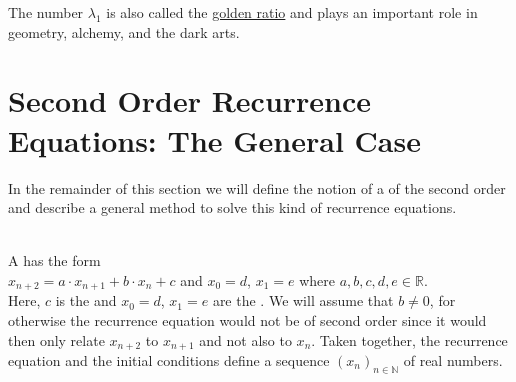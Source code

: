 \remark 
The number $\lambda_1$ is also called the \href{https://en.wikipedia.org/wiki/Golden_ratio}{golden ratio} 
and plays an important role in geometry, alchemy, and the dark arts. \eoxs

\section[The General Case]{Second Order Recurrence Equations: The General Case}
In the remainder of this section we will define the notion of a 
of the second order and describe a general method to solve this kind of recurrence equations.

\begin{Definition} \hspace*{\fill} \\
  A 
  has the form
  \\[0.2cm]
  \hspace*{1.3cm}
  $x_{n+2} = a \cdot x_{n+1} + b \cdot x_n + c$ \quad and \quad $x_0 = d$, $x_1 = e$
  \quad where $a, b, c, d, e \in \mathbb{R}$.
  \\[0.2cm]
  Here, $c$ is the  and $x_0 = d$, $x_1 = e$ are the .
  We will assume that $b \not= 0$, for otherwise the recurrence equation would not be of second order since it
  would then only relate $x_{n+2}$ to $x_{n+1}$ and not also to $x_n$.
  Taken together, the recurrence equation and the initial conditions define a sequence $(x_n)_{n\in\mathbb{N}}$ of real numbers.  \eox
\end{Definition}

